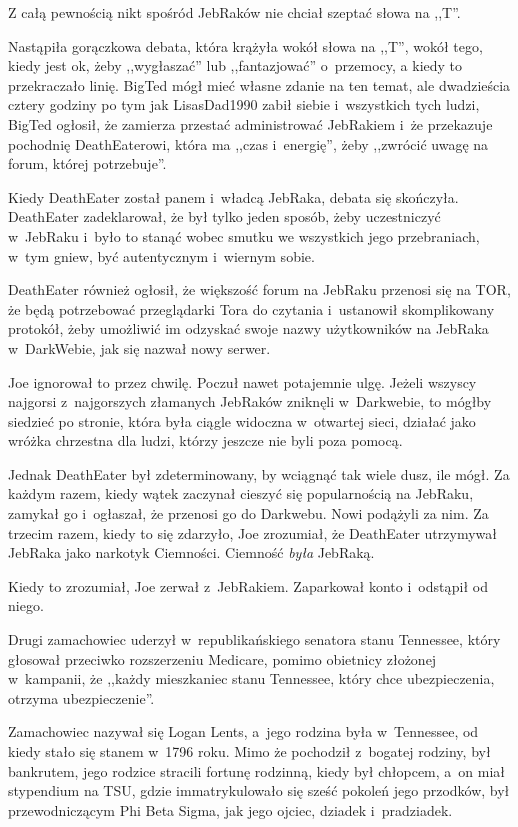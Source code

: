 \documentclass[oneside,polish,11pt,sfheadings]{mwbk}
\begin{document}
Z całą pewnością nikt spośród JebRaków nie chciał szeptać słowa na
,,T''.

Nastąpiła gorączkowa debata, która krążyła wokół słowa na ,,T'', wokół
tego, kiedy jest ok, żeby ,,wygłaszać'' lub ,,fantazjować'' o~przemocy,
a kiedy to przekraczało linię. BigTed mógł mieć własne zdanie na ten
temat, ale dwadzieścia cztery godziny po tym jak LisasDad1990 zabił
siebie i~wszystkich tych ludzi, BigTed ogłosił, że zamierza przestać
administrować JebRakiem i~że przekazuje pochodnię DeathEaterowi, która
ma ,,czas i~energię'', żeby ,,zwrócić uwagę na forum, której
potrzebuje''.

Kiedy DeathEater został panem i~władcą JebRaka, debata się skończyła.
DeathEater zadeklarował, że był tylko jeden sposób, żeby uczestniczyć w~JebRaku i~było to stanąć wobec smutku we wszystkich jego przebraniach, w~tym gniew, być autentycznym i~wiernym sobie.

DeathEater również ogłosił, że większość forum na JebRaku przenosi się
na TOR, że będą potrzebować przeglądarki Tora do czytania i~ustanowił
skomplikowany protokół, żeby umożliwić im odzyskać swoje nazwy
użytkowników na JebRaka w~DarkWebie, jak się nazwał nowy serwer.

Joe ignorował to przez chwilę. Poczuł nawet potajemnie ulgę. Jeżeli
wszyscy najgorsi z~najgorszych złamanych JebRaków zniknęli w~Darkwebie,
to mógłby siedzieć po stronie, która była ciągle widoczna w~otwartej
sieci, działać jako wróżka chrzestna dla ludzi, którzy jeszcze nie byli
poza pomocą.

Jednak DeathEater był zdeterminowany, by wciągnąć tak wiele dusz, ile
mógł. Za każdym razem, kiedy wątek zaczynał cieszyć się popularnością na
JebRaku, zamykał go i~ogłaszał, że przenosi go do Darkwebu. Nowi
podążyli za nim. Za trzecim razem, kiedy to się zdarzyło, Joe zrozumiał,
że DeathEater utrzymywał JebRaka jako narkotyk Ciemności. Ciemność
\textit{była} JebRaką.

Kiedy to zrozumiał, Joe zerwał z~JebRakiem. Zaparkował konto i~odstąpił
od niego.

Drugi zamachowiec uderzył w~republikańskiego senatora stanu Tennessee,
który głosował przeciwko rozszerzeniu Medicare, pomimo obietnicy
złożonej w~kampanii, że ,,każdy mieszkaniec stanu Tennessee, który chce
ubezpieczenia, otrzyma ubezpieczenie''.

Zamachowiec nazywał się Logan Lents, a~jego rodzina była w~Tennessee, od
kiedy stało się stanem w~1796 roku. Mimo że pochodził z~bogatej rodziny,
był bankrutem, jego rodzice stracili fortunę rodzinną, kiedy był
chłopcem, a~on miał stypendium na TSU, gdzie immatrykulowało się sześć
pokoleń jego przodków, był przewodniczącym Phi Beta Sigma, jak jego
ojciec, dziadek i~pradziadek.
\end{document}

